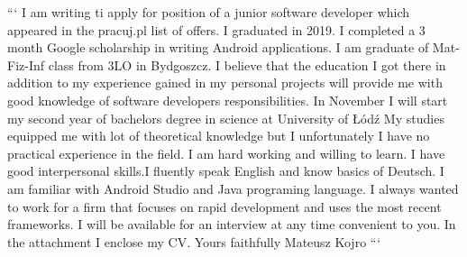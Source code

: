 ```
    I am writing ti apply for position of a junior software developer which appeared in the pracuj.pl list of offers.
    I graduated in 2019. I completed a 3 month Google scholarship in writing Android applications. I am graduate of Mat-Fiz-Inf class from 3LO in Bydgoszcz. I believe that the education I got there in addition to my experience gained in my personal projects will provide me with good knowledge of software developers responsibilities. In November I will start my second year of bachelors degree in science at University of Łódź
My studies equipped me with lot of theoretical knowledge but I unfortunately I have no practical experience in the field.
    I am hard working and willing to learn. I have good interpersonal skills.I fluently speak English and know basics of Deutsch. I am familiar with Android Studio and Java programing language.
    I always wanted to work for a firm that focuses on rapid development and uses the most recent frameworks.
    I will be available for an interview at any time convenient to you. In the attachment I enclose my CV.
Yours faithfully
Mateusz Kojro
```
